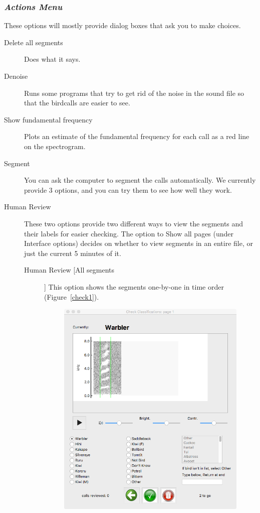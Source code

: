 \documentclass{article}
\begin{document}
\subsubsection{{\em Actions Menu}}
\label{sec:action}

These options will mostly provide dialog boxes that ask you to make choices. 

\begin{description}
\item [Delete all segments] Does what it says. 
\item [Denoise] Runs some programs that try to get rid of the noise in the sound file so that the birdcalls are easier to see. 
\item [Show fundamental frequency] Plots an estimate of the fundamental frequency for each call as a red line on the spectrogram.
\item [Segment] You can ask the computer to segment the calls automatically. 
We currently provide 3 options, and you can try them to see how well they work.
\item [Human Review] These two options provide two different ways to view the segments and their labels for easier checking. The option to Show all pages (under Interface options) decides on whether to view segments in an entire file, or just the current 5 minutes of it. 
	\begin{description}
	\item [Human Review [All segments]] This option shows the segments one-by-one in time order (Figure~\ref{check1}).
	\begin{figure}
	\centering
	\includegraphics[width=.6\textwidth]{Figs/review1}

\end{figure}
\end{description}
\end{description}
\end{document}
